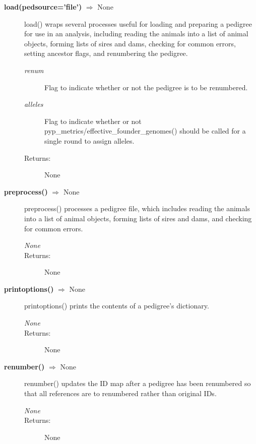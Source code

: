 \begin{description}
\item[\textbf{load(pedsource='file')} $\Rightarrow$ None]
load() wraps several processes useful for loading and preparing a pedigree for use in an analysis, including reading the animals into a list of animal objects, forming lists of sires and dams, checking for common errors, setting ancestor flags, and renumbering the pedigree.
\begin{description}
\item[\emph{renum}] Flag to indicate whether or not the pedigree is to be renumbered.
\item[\emph{alleles}] Flag to indicate whether or not pyp\_metrics/effective\_founder\_genomes() should be called for a single round to assign alleles.
\item[Returns:] None
\end{description}

\item[\textbf{preprocess()} $\Rightarrow$ None]
preprocess() processes a pedigree file, which includes reading the animals into a list of animal objects, forming lists of sires and dams, and checking for common errors.
\begin{description}
\item[\emph{None}]
\item[Returns:] None
\end{description}

\item[\textbf{printoptions()} $\Rightarrow$ None]
printoptions() prints the contents of a pedigree's  dictionary.
\begin{description}
\item[\emph{None}]
\item[Returns:] None
\end{description}

\item[\textbf{renumber()} $\Rightarrow$ None]
renumber() updates the ID map after a pedigree has been renumbered so that all references are to renumbered rather than original IDs.
\begin{description}
\item[\emph{None}]
\item[Returns:] None
\end{description}


\end{description}
